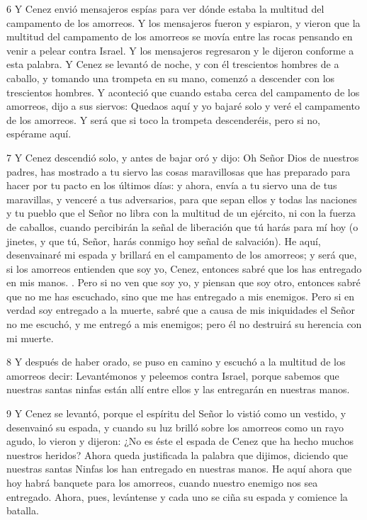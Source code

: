 \par 6 Y Cenez envió mensajeros espías para ver dónde estaba la multitud del campamento de los amorreos. Y los mensajeros fueron y espiaron, y vieron que la multitud del campamento de los amorreos se movía entre las rocas pensando en venir a pelear contra Israel. Y los mensajeros regresaron y le dijeron conforme a esta palabra. Y Cenez se levantó de noche, y con él trescientos hombres de a caballo, y tomando una trompeta en su mano, comenzó a descender con los trescientos hombres. Y aconteció que cuando estaba cerca del campamento de los amorreos, dijo a sus siervos: Quedaos aquí y yo bajaré solo y veré el campamento de los amorreos. Y será que si toco la trompeta descenderéis, pero si no, espérame aquí.

\par 7 Y Cenez descendió solo, y antes de bajar oró y dijo: Oh Señor Dios de nuestros padres, has mostrado a tu siervo las cosas maravillosas que has preparado para hacer por tu pacto en los últimos días: y ahora, envía a tu siervo una de tus maravillas, y venceré a tus adversarios, para que sepan ellos y todas las naciones y tu pueblo que el Señor no libra con la multitud de un ejército, ni con la fuerza de caballos, cuando percibirán la señal de liberación que tú harás para mí hoy (o jinetes, y que tú, Señor, harás conmigo hoy señal de salvación). He aquí, desenvainaré mi espada y brillará en el campamento de los amorreos; y será que, si los amorreos entienden que soy yo, Cenez, entonces sabré que los has entregado en mis manos. . Pero si no ven que soy yo, y piensan que soy otro, entonces sabré que no me has escuchado, sino que me has entregado a mis enemigos. Pero si en verdad soy entregado a la muerte, sabré que a causa de mis iniquidades el Señor no me escuchó, y me entregó a mis enemigos; pero él no destruirá su herencia con mi muerte.

\par 8 Y después de haber orado, se puso en camino y escuchó a la multitud de los amorreos decir: Levantémonos y peleemos contra Israel, porque sabemos que nuestras santas ninfas están allí entre ellos y las entregarán en nuestras manos.

\par 9 Y Cenez se levantó, porque el espíritu del Señor lo vistió como un vestido, y desenvainó su espada, y cuando su luz brilló sobre los amorreos como un rayo agudo, lo vieron y dijeron: ¿No es éste el espada de Cenez que ha hecho muchos nuestros heridos? Ahora queda justificada la palabra que dijimos, diciendo que nuestras santas Ninfas los han entregado en nuestras manos. He aquí ahora que hoy habrá banquete para los amorreos, cuando nuestro enemigo nos sea entregado. Ahora, pues, levántense y cada uno se ciña su espada y comience la batalla.

